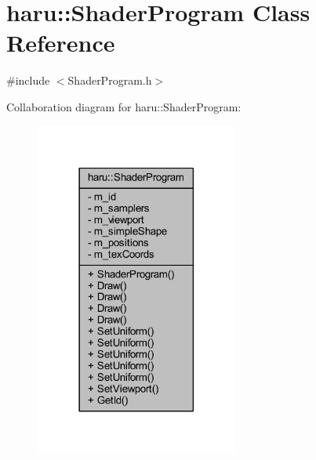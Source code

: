 \hypertarget{classharu_1_1_shader_program}{}\section{haru\+:\+:Shader\+Program Class Reference}
\label{classharu_1_1_shader_program}


{\ttfamily \#include $<$Shader\+Program.\+h$>$}



Collaboration diagram for haru\+:\+:Shader\+Program\+:\nopagebreak
\begin{figure}[H]
\begin{center}
\leavevmode
\includegraphics[width=189pt]{classharu_1_1_shader_program__coll__graph}
\end{center}
\end{figure}
